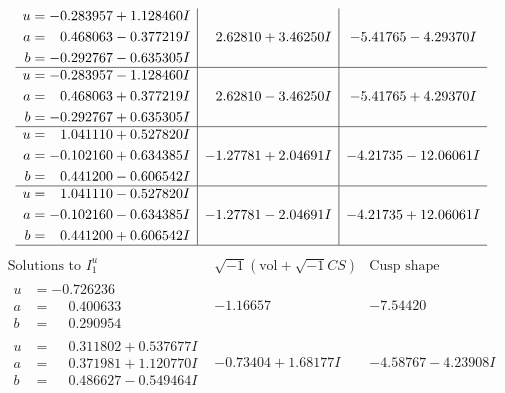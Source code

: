 \documentclass[1p]{elsarticle_modified}
\theoremstyle{definition}
\newcommand{\I}{\sqrt{-1}}
\begin{document}
$$\begin{array}{c|c|c}
\begin{aligned}
u &= -0.283957 + 1.128460 I \\
a &= \phantom{-}0.468063 - 0.377219 I \\
b &= -0.292767 - 0.635305 I\end{aligned}
 & \phantom{-}2.62810 + 3.46250 I & -5.41765 - 4.29370 I \\ \hline\begin{aligned}
u &= -0.283957 - 1.128460 I \\
a &= \phantom{-}0.468063 + 0.377219 I \\
b &= -0.292767 + 0.635305 I\end{aligned}
 & \phantom{-}2.62810 - 3.46250 I & -5.41765 + 4.29370 I \\ \hline\begin{aligned}
u &= \phantom{-}1.041110 + 0.527820 I \\
a &= -0.102160 + 0.634385 I \\
b &= \phantom{-}0.441200 - 0.606542 I\end{aligned}
 & -1.27781 + 2.04691 I & -4.21735 - 12.06061 I \\ \hline\begin{aligned}
u &= \phantom{-}1.041110 - 0.527820 I \\
a &= -0.102160 - 0.634385 I \\
b &= \phantom{-}0.441200 + 0.606542 I\end{aligned}
 & -1.27781 - 2.04691 I & -4.21735 + 12.06061 I\\
 \hline 
 \end{array}$$\newpage$$\begin{array}{c|c|c}  
\text{Solutions to }I^u_{1}& \I (\text{vol} + \sqrt{-1}CS) & \text{Cusp shape}\\
 \hline 
\begin{aligned}
u &= -0.726236\phantom{ +0.000000I} \\
a &= \phantom{-}0.400633\phantom{ +0.000000I} \\
b &= \phantom{-}0.290954\phantom{ +0.000000I}\end{aligned}
 & -1.16657\phantom{ +0.000000I} & -7.54420\phantom{ +0.000000I} \\ \hline\begin{aligned}
u &= \phantom{-}0.311802 + 0.537677 I \\
a &= \phantom{-}0.371981 + 1.120770 I \\
b &= \phantom{-}0.486627 - 0.549464 I\end{aligned}
 & -0.73404 + 1.68177 I & -4.58767 - 4.23908 I \\ \hline\begin{aligned}

\end{aligned}
\end{array}$$
\end{document}
